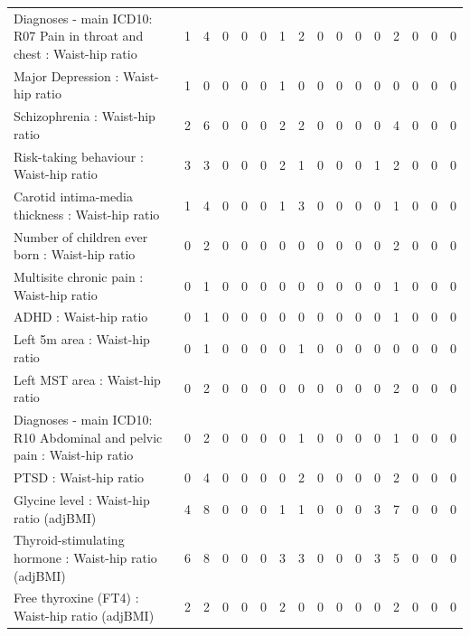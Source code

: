 \begin{table}[ht]
\begin{tabular}{lrrrrrrrrrrrrrrr}
  Diagnoses - main ICD10: R07 Pain in throat and chest : Waist-hip ratio  &   1 &   4 &   0 &   0 &   0 &   1 &   2 &   0 &   0 &   0 &   0 &   2 &   0 &   0 &   0 \\ 
  Major Depression : Waist-hip ratio  &   1 &   0 &   0 &   0 &   0 &   1 &   0 &   0 &   0 &   0 &   0 &   0 &   0 &   0 &   0 \\ 
  Schizophrenia : Waist-hip ratio  &   2 &   6 &   0 &   0 &   0 &   2 &   2 &   0 &   0 &   0 &   0 &   4 &   0 &   0 &   0 \\ 
  Risk-taking behaviour : Waist-hip ratio  &   3 &   3 &   0 &   0 &   0 &   2 &   1 &   0 &   0 &   0 &   1 &   2 &   0 &   0 &   0 \\ 
  Carotid intima-media thickness : Waist-hip ratio  &   1 &   4 &   0 &   0 &   0 &   1 &   3 &   0 &   0 &   0 &   0 &   1 &   0 &   0 &   0 \\ 
  Number of children ever born  : Waist-hip ratio  &   0 &   2 &   0 &   0 &   0 &   0 &   0 &   0 &   0 &   0 &   0 &   2 &   0 &   0 &   0 \\ 
  Multisite chronic pain : Waist-hip ratio  &   0 &   1 &   0 &   0 &   0 &   0 &   0 &   0 &   0 &   0 &   0 &   1 &   0 &   0 &   0 \\ 
  ADHD : Waist-hip ratio  &   0 &   1 &   0 &   0 &   0 &   0 &   0 &   0 &   0 &   0 &   0 &   1 &   0 &   0 &   0 \\ 
  Left 5m area : Waist-hip ratio  &   0 &   1 &   0 &   0 &   0 &   0 &   1 &   0 &   0 &   0 &   0 &   0 &   0 &   0 &   0 \\ 
  Left MST area : Waist-hip ratio  &   0 &   2 &   0 &   0 &   0 &   0 &   0 &   0 &   0 &   0 &   0 &   2 &   0 &   0 &   0 \\ 
  Diagnoses - main ICD10: R10 Abdominal and pelvic pain : Waist-hip ratio  &   0 &   2 &   0 &   0 &   0 &   0 &   1 &   0 &   0 &   0 &   0 &   1 &   0 &   0 &   0 \\ 
  PTSD : Waist-hip ratio  &   0 &   4 &   0 &   0 &   0 &   0 &   2 &   0 &   0 &   0 &   0 &   2 &   0 &   0 &   0 \\ 
  Glycine level  : Waist-hip ratio (adjBMI) &   4 &   8 &   0 &   0 &   0 &   1 &   1 &   0 &   0 &   0 &   3 &   7 &   0 &   0 &   0 \\ 
  Thyroid-stimulating hormone  : Waist-hip ratio (adjBMI) &   6 &   8 &   0 &   0 &   0 &   3 &   3 &   0 &   0 &   0 &   3 &   5 &   0 &   0 &   0 \\ 
  Free thyroxine (FT4) : Waist-hip ratio (adjBMI) &   2 &   2 &   0 &   0 &   0 &   2 &   0 &   0 &   0 &   0 &   0 &   2 &   0 &   0 &   0 \\ 

\end{tabular}
\end{table}

